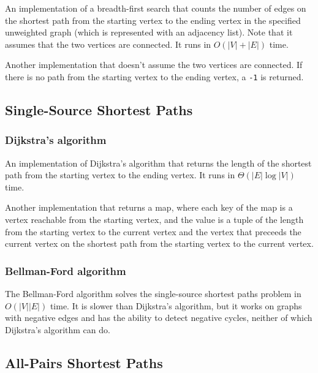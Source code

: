 \documentclass[11pt,a4paper,titlepage]{article}
\begin{document}
			An implementation of a breadth-first search that counts the number of edges on the shortest path from the starting vertex to the ending vertex in the specified unweighted graph (which is represented with an adjacency list). Note that it assumes that the two vertices are connected. It runs in $O(|V|+|E|)$ time.
			

			Another implementation that doesn't assume the two vertices are connected. If there is no path from the starting vertex to the ending vertex, a \lstinline$-1$ is returned.
			


		\subsection{Single-Source Shortest Paths}
			\subsubsection{Dijkstra's algorithm}
				An implementation of Dijkstra's algorithm that returns the length of the shortest path from the starting vertex to the ending vertex. It runs in $\Theta(|E|\log{|V|})$ time.
				

				Another implementation that returns a map, where each key of the map is a vertex reachable from the starting vertex, and the value is a tuple of the length from the starting vertex to the current vertex and the vertex that preceeds the current vertex on the shortest path from the starting vertex to the current vertex.
				
			\subsubsection{Bellman-Ford algorithm}
				The Bellman-Ford algorithm solves the single-source shortest paths problem in $O(|V||E|)$ time. It is slower than Dijkstra's algorithm, but it works on graphs with negative edges and has the ability to detect negative cycles, neither of which Dijkstra's algorithm can do.
				
		\subsection{All-Pairs Shortest Paths}
\end{document}
